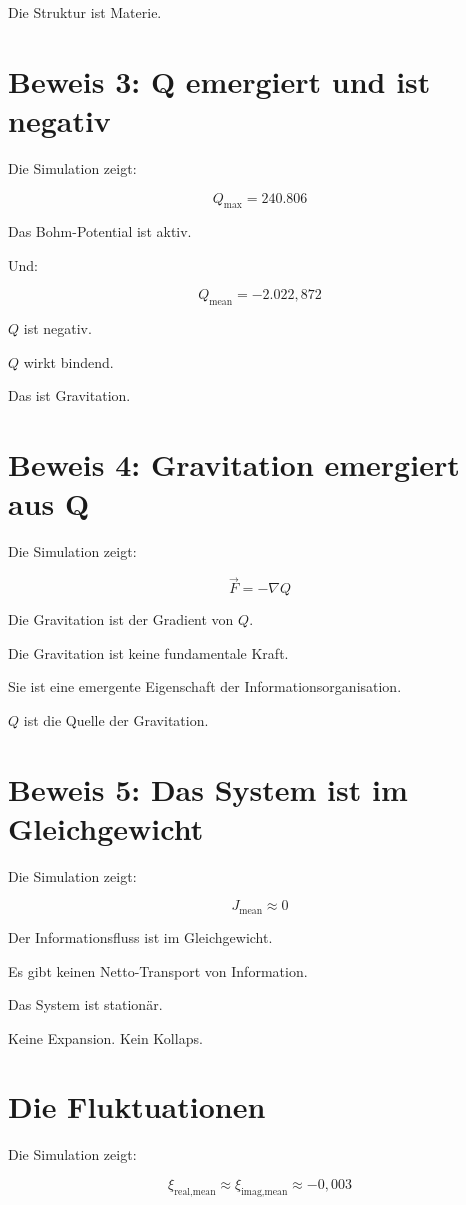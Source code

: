 Die Struktur ist Materie.

\section{Beweis 3: Q emergiert und ist negativ}

Die Simulation zeigt:

\[
Q_{\text{max}} = 240.806
\]

Das Bohm-Potential ist aktiv.

Und:

\[
Q_{\text{mean}} = -2.022,872
\]

\( Q \) ist negativ.

\( Q \) wirkt bindend.

Das ist Gravitation.

\section{Beweis 4: Gravitation emergiert aus Q}

Die Simulation zeigt:

\[
\vec{F} = -\nabla Q
\]

Die Gravitation ist der Gradient von \( Q \).

Die Gravitation ist keine fundamentale Kraft.

Sie ist eine emergente Eigenschaft der Informationsorganisation.

\( Q \) ist die Quelle der Gravitation.

\section{Beweis 5: Das System ist im Gleichgewicht}

Die Simulation zeigt:

\[
J_{\text{mean}} \approx 0
\]

Der Informationsfluss ist im Gleichgewicht.

Es gibt keinen Netto-Transport von Information.

Das System ist stationär.

Keine Expansion. Kein Kollaps.

\section{Die Fluktuationen}

Die Simulation zeigt:

\[
\xi_{\text{real,mean}} \approx \xi_{\text{imag,mean}} \approx -0,003
\]

